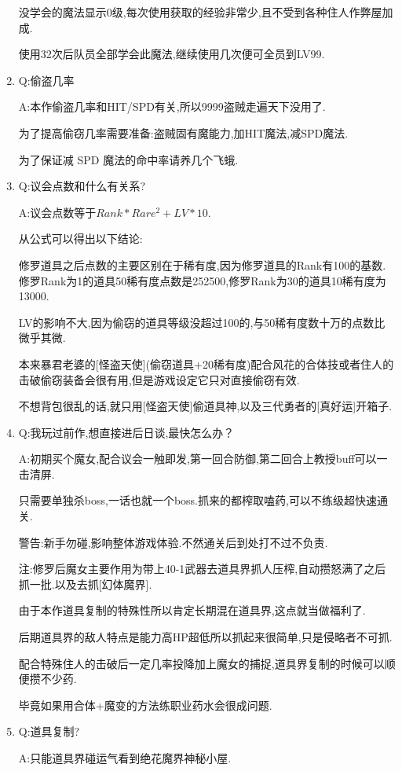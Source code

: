 \begin{enumerate}
	没学会的魔法显示0级,每次使用获取的经验非常少,且不受到各种住人作弊屋加成.

	使用32次后队员全部学会此魔法,继续使用几次便可全员到LV99.

	\item
	Q:偷盗几率

	A:本作偷盗几率和HIT/SPD有关,所以9999盗贼走遍天下没用了.

	为了提高偷窃几率需要准备:盗贼固有魔能力,加HIT魔法,减SPD魔法.

	为了保证减 SPD 魔法的命中率请养几个飞蛾.

	\item
	Q:议会点数和什么有关系?

	A:议会点数等于$Rank*Rare^2+LV*10$.

	从公式可以得出以下结论:

	修罗道具之后点数的主要区别在于稀有度,因为修罗道具的Rank有100的基数.修罗Rank为1的道具50稀有度点数是252500,修罗Rank为30的道具10稀有度为13000.

	LV的影响不大,因为偷窃的道具等级没超过100的,与50稀有度数十万的点数比微乎其微.

	本来暴君老婆的[怪盗天使](偷窃道具+20稀有度)配合风花的合体技或者住人的击破偷窃装备会很有用,但是游戏设定它只对直接偷窃有效.

	不想背包很乱的话,就只用[怪盗天使]偷道具神,以及三代勇者的[真好运]开箱子.

	\item
	Q:我玩过前作,想直接进后日谈,最快怎么办？

	A:初期买个魔女,配合议会一触即发,第一回合防御,第二回合上教授buff可以一击清屏.

	只需要单独杀boss,一话也就一个boss.抓来的都榨取嗑药,可以不练级超快速通关.

	警告:新手勿碰,影响整体游戏体验.不然通关后到处打不过不负责.

	注:修罗后魔女主要作用为带上40-1武器去道具界抓人压榨,自动攒怒满了之后抓一批.以及去抓[幻体魔界].

	由于本作道具复制的特殊性所以肯定长期混在道具界,这点就当做福利了.

	后期道具界的敌人特点是能力高HP超低所以抓起来很简单,只是侵略者不可抓.

	配合特殊住人的击破后一定几率投降加上魔女的捕捉,道具界复制的时候可以顺便攒不少药.

	毕竟如果用合体+魔变的方法练职业药水会很成问题.


	\item
	Q:道具复制?

	A:只能道具界碰运气看到绝花魔界神秘小屋.


\end{enumerate}
